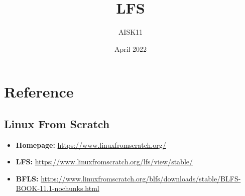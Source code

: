 \documentclass[10pt, a4paper, onecolumn, oneside, titlepage, openany]{book}
\title{\textbf{LFS}}
\author{AISK11}
\date{April 2022}
\begin{document}
\maketitle
\tableofcontents

\chapter{}


\chapter{Reference}
\section{Linux From Scratch}
\begin{itemize}
    \item \textbf{Homepage:} \url{https://www.linuxfromscratch.org/}
    \item \textbf{LFS:} \url{https://www.linuxfromscratch.org/lfs/view/stable/}
    \item \textbf{BFLS:}  \url{https://www.linuxfromscratch.org/blfs/downloads/stable/BLFS-BOOK-11.1-nochunks.html}
\end{itemize}
\end{document}

